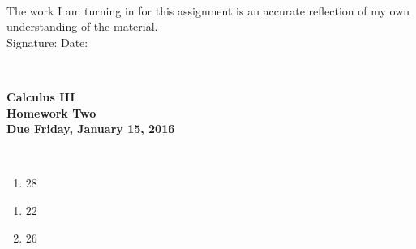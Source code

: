 \documentclass[12pt]{article}
\begin{document}
\\

\bigskip
\bigskip
\bigskip
\bigskip
\bigskip
\bigskip
\noindent The work I am turning in for this assignment is an accurate
reflection of my own understanding of the material.\\[14pt]

\noindent Signature: \underline{\hspace{7cm}} \hspace{1cm} Date:
\underline{\hspace{5cm}} 


\hspace{2mm}\\
\newpage



 
\begin{center}
{\large {\bf Calculus III}}\\
\medskip
{\large {\bf Homework Two}}\\
\medskip
{ {\bf Due Friday, January 15, 2016}}\\
\end{center}

\hspace{2mm}\\


\begin{enumerate}
\setlength{\itemsep}{-1mm}
   \item 28
\end{enumerate}


\begin{enumerate}
\setlength{\itemsep}{-1mm}
  \item 22
  \item 26
\end{enumerate}


\end{document}
